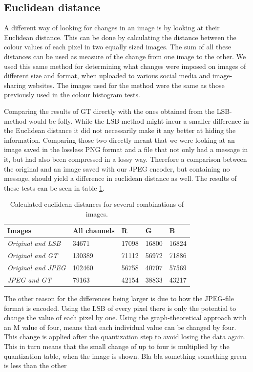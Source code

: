\subsection{Euclidean distance}
A different way of looking for changes in an image is by looking at their Euclidean distance.
This can be done by calculating the distance between the colour values of each pixel in two equally sized images.
The sum of all these distances can be used as measure of the change from one image to the other.
We used this same method for determining what changes were imposed on images of different size and format, when uploaded to various social media and image-sharing websites.
The images used for the method were the same as those previously used in the colour histogram tests.

Comparing the results of GT directly with the ones obtained from the LSB-method would be folly.
While the LSB-method might incur a smaller difference in the Euclidean distance it did not necessarily make it any better at hiding the information.
Comparing those two directly meant that we were looking at an image saved in the lossless PNG format and a file that not only had a message in it, but had also been compressed in a lossy way.
Therefore a comparison between the original and an image saved with our JPEG encoder, but containing no message, should yield a difference in euclidean distance as well.
The results of these tests can be seen in table \ref {fig:euclidean_distance}.

\begin{table}[]
	\centering
	\begin{tabular}{@{}lllll@{}}
		\toprule
		\textbf{Images}            & \textbf{All channels} & \textbf{R} & \textbf{G} & \textbf{B} \\ \midrule
		\textit{Original and LSB}  & 34671                 & 17098      & 16800      & 16824      \\
		\textit{Original and GT}   & 130389                & 71112      & 56972      & 71886      \\
		\textit{Original and JPEG} & 102460                & 56758      & 40707      & 57569      \\
		\textit{JPEG and GT}       & 79163                 & 42154      & 38833      & 43217     
	\end{tabular}
	\caption{Calculated euclidean distances for several combinations of images.}
	\label{fig:euclidean_distance}
\end{table}

The other reason for the differences being larger is due to how the JPEG-file format is encoded.
Using the LSB of every pixel there is only the potential to change the value of each pixel by one.
Using the graph-theoretical approach with an M value of four, means that each individual value can be changed by four. 
This change is applied after the quantization step to avoid losing the data again.
This in turn means that the small change of up to four is multiplied by the quantization table, when the image is shown.
Bla bla something something green is less than the other

